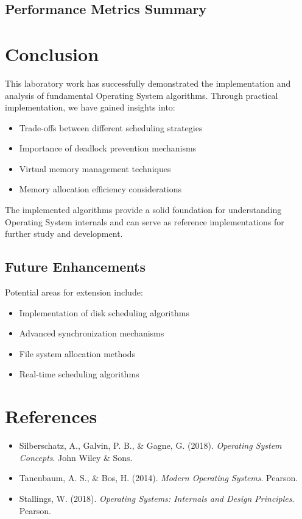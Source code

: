 \documentclass[12pt,a4paper]{article}
\begin{document}
\subsection{Performance Metrics Summary}

\vspace{4cm}

\section{Conclusion}

This laboratory work has successfully demonstrated the implementation and analysis of fundamental Operating System algorithms. Through practical implementation, we have gained insights into:

\begin{itemize}
    \item Trade-offs between different scheduling strategies
    \item Importance of deadlock prevention mechanisms
    \item Virtual memory management techniques
    \item Memory allocation efficiency considerations
\end{itemize}

The implemented algorithms provide a solid foundation for understanding Operating System internals and can serve as reference implementations for further study and development.

\subsection{Future Enhancements}
Potential areas for extension include:
\begin{itemize}
    \item Implementation of disk scheduling algorithms
    \item Advanced synchronization mechanisms
    \item File system allocation methods
    \item Real-time scheduling algorithms
\end{itemize}

\section{References}

\begin{itemize}
    \item Silberschatz, A., Galvin, P. B., \& Gagne, G. (2018). \textit{Operating System Concepts}. John Wiley \& Sons.
    \item Tanenbaum, A. S., \& Bos, H. (2014). \textit{Modern Operating Systems}. Pearson.
    \item Stallings, W. (2018). \textit{Operating Systems: Internals and Design Principles}. Pearson.
\end{itemize}
\end{document}
